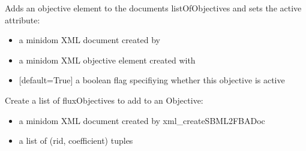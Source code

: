 \documentclass[letterpaper,10pt,english]{sphinxmanual}
\begin{document}

\begin{fulllineitems}
\label{\detokenize{modules_doc:cbmpy.CBXML.xml_addSBML2FBAObjective}}
\pysigstartsignatures
{}
\pysigstopsignatures
\sphinxAtStartPar
Adds an objective element to the documents listOfObjectives and sets the active attribute:
\begin{itemize}
\item {} 
\sphinxAtStartPar
{} a minidom XML document created by 

\item {} 
\sphinxAtStartPar
{} a minidom XML objective element created with 

\item {} 
\sphinxAtStartPar
{} {[}default=True{]} a boolean flag specifiying whether this objective is active

\end{itemize}

\end{fulllineitems}


\begin{fulllineitems}
\label{\detokenize{modules_doc:cbmpy.CBXML.xml_createListOfFluxObjectives}}
\pysigstartsignatures
{}
\pysigstopsignatures
\sphinxAtStartPar
Create a list of fluxObjectives to add to an Objective:
\begin{itemize}
\item {} 
\sphinxAtStartPar
{} a minidom XML document created by xml\_createSBML2FBADoc

\item {} 
\sphinxAtStartPar
{} a list of (rid, coefficient) tuples

\end{itemize}

\end{fulllineitems}
\end{document}

